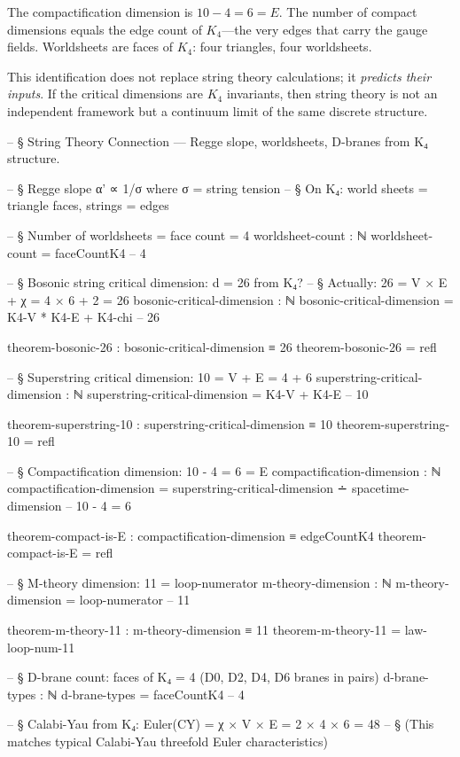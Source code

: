 \documentclass[11pt,a4paper]{book}
\begin{document}
The compactification dimension is $10 - 4 = 6 = E$. The number of compact dimensions equals the edge count of $K_4$---the very edges that carry the gauge fields. Worldsheets are faces of $K_4$: four triangles, four worldsheets.

This identification does not replace string theory calculations; it \emph{predicts their inputs}. If the critical dimensions are $K_4$ invariants, then string theory is not an independent framework but a continuum limit of the same discrete structure.


\begin{code}
-- § String Theory Connection — Regge slope, worldsheets, D-branes from K₄ structure.

-- § Regge slope α' ∝ 1/σ where σ = string tension
-- § On K₄: world sheets = triangle faces, strings = edges

-- § Number of worldsheets = face count = 4
worldsheet-count : ℕ
worldsheet-count = faceCountK4  -- 4

-- § Bosonic string critical dimension: d = 26 from K₄?
-- § Actually: 26 = V × E + χ = 4 × 6 + 2 = 26
bosonic-critical-dimension : ℕ
bosonic-critical-dimension = K4-V * K4-E + K4-chi  -- 26

theorem-bosonic-26 : bosonic-critical-dimension ≡ 26
theorem-bosonic-26 = refl

-- § Superstring critical dimension: 10 = V + E = 4 + 6
superstring-critical-dimension : ℕ
superstring-critical-dimension = K4-V + K4-E  -- 10

theorem-superstring-10 : superstring-critical-dimension ≡ 10
theorem-superstring-10 = refl

-- § Compactification dimension: 10 - 4 = 6 = E
compactification-dimension : ℕ
compactification-dimension = superstring-critical-dimension ∸ spacetime-dimension  -- 10 - 4 = 6

theorem-compact-is-E : compactification-dimension ≡ edgeCountK4
theorem-compact-is-E = refl

-- § M-theory dimension: 11 = loop-numerator
m-theory-dimension : ℕ
m-theory-dimension = loop-numerator  -- 11

theorem-m-theory-11 : m-theory-dimension ≡ 11
theorem-m-theory-11 = law-loop-num-11

-- § D-brane count: faces of K₄ = 4 (D0, D2, D4, D6 branes in pairs)
d-brane-types : ℕ
d-brane-types = faceCountK4  -- 4

-- § Calabi-Yau from K₄: Euler(CY) = χ × V × E = 2 × 4 × 6 = 48
-- § (This matches typical Calabi-Yau threefold Euler characteristics)


\end{code}
\end{document}
